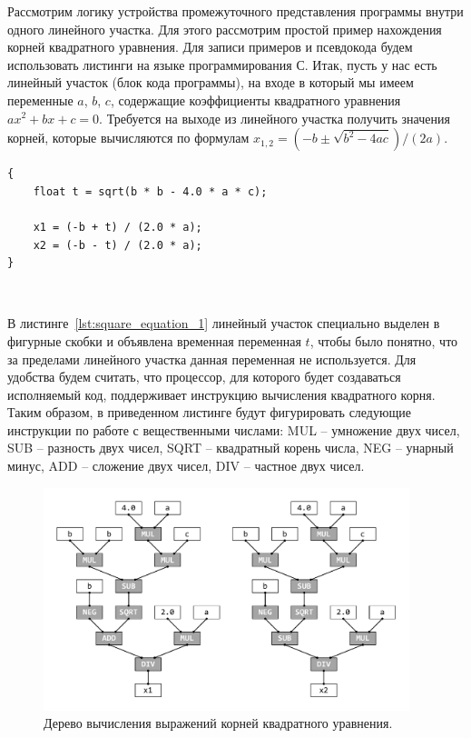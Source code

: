 \documentclass[
11pt,%
tightenlines,%
twoside,%
onecolumn,%
nofloats,%
nobibnotes,%
nofootinbib,%
superscriptaddress,%
noshowpacs,%
centertags]%
{revtex4}
\begin{document}
Рассмотрим логику устройства промежуточного представления программы внутри одного линейного участка.
Для этого рассмотрим простой пример нахождения корней квадратного уравнения.
Для записи примеров и псевдокода будем использовать листинги на языке программирования С.
Итак, пусть у нас есть линейный участок (блок кода программы), на входе в который мы имеем переменные $a$, $b$, $c$, содержащие коэффициенты квадратного уравнения $ax^2 + bx + c = 0$.
Требуется на выходе из линейного участка получить значения корней, которые вычисляются по формулам $x_{1,2} = (-b \pm \sqrt{b^2 - 4ac})/(2a)$.

\begin{lstlisting}[caption={Текст блока кода по вычислению корней квадратного уравнения.},label={lst:square_equation_1}]
{
    float t = sqrt(b * b - 4.0 * a * c);
    
    x1 = (-b + t) / (2.0 * a);
    x2 = (-b - t) / (2.0 * a);
}
\end{lstlisting}

\

В листинге~\ref{lst:square_equation_1} линейный участок специально выделен в фигурные скобки и объявлена временная переменная $t$, чтобы было понятно, что за пределами линейного участка данная переменная не используется.
Для удобства будем считать, что процессор, для которого будет создаваться исполняемый код, поддерживает инструкцию вычисления квадратного корня.
Таким образом, в приведенном листинге будут фигурировать следующие инструкции по работе с вещественными числами: MUL -- умножение двух чисел, SUB -- разность двух чисел, SQRT -- квадратный корень числа, NEG -- унарный минус, ADD -- сложение двух чисел, DIV -- частное двух чисел.

\begin{figure}[h]
\setcaptionmargin{5mm}
\includegraphics[width=0.95\textwidth]{pics/square_equation_calculation_tree.pdf}
\caption{Дерево вычисления выражений корней квадратного уравнения.}\label{fig:square_equation_calculation_tree}
\end{figure}
\end{document}
